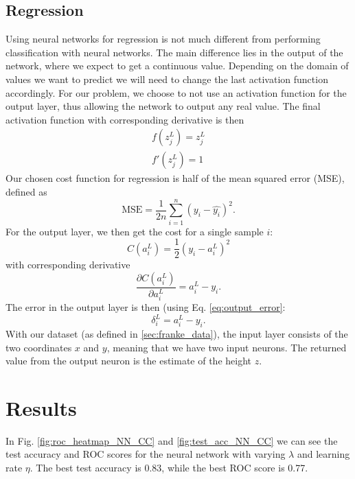 \documentclass[%
 reprint,
nofootinbib,
 amsmath,amssymb,
 aps,
]{revtex4-2}
\begin{document}
\subsection{Regression}
Using neural networks for regression is not much different from performing classification with neural networks. The main difference lies in the output of the network, where we expect to get a continuous value. Depending on the domain of values we want to predict we will need to change the last activation function accordingly. For our problem, we choose to not use an activation function for the output layer, thus allowing the network to output any real value. The final activation function with corresponding derivative is then
%
\begin{gather*}
f(z_j^L) = z_j^L \\
f'(z_j^L) = 1
\end{gather*}
%
Our chosen cost function for regression is half of the mean squared error (MSE), defined as
%
\begin{equation*}
\textrm{MSE} = \frac{1}{2n} \sum_{i=1}^n \left(y_i - \hat{y_i} \right)^2 .
\end{equation*}
%
For the output layer, we then get the cost for a single sample $i$:
%
\begin{equation*}
C(a_i^L) = \frac{1}{2} \left(y_i - a_i^L \right)^2
\end{equation*}
%
with corresponding derivative
%
\begin{equation*}
\frac{\partial C(a_i^L)}{\partial a_i^L} = a_i^L - y_i .
\end{equation*}
%
The error in the output layer is then (using Eq. \eqref{eq:output_error}:
%
\begin{equation*}
\delta_i^L = a_i^L - y_i .
\end{equation*}
%
With our dataset (as defined in \ref{sec:franke_data}), the input layer consists of the two coordinates $x$ and $y$, meaning that we have two input neurons. The returned value from the output neuron is the estimate of the height $z$.

\section{Results}\label{sec:results}
In Fig. \ref{fig:roc_heatmap_NN_CC} and \ref{fig:test_acc_NN_CC} we can see the test accuracy and ROC scores for the neural network with varying $\lambda$ and learning rate $\eta$. The best test accuracy is 0.83, while the best ROC score is 0.77.
\end{document}

